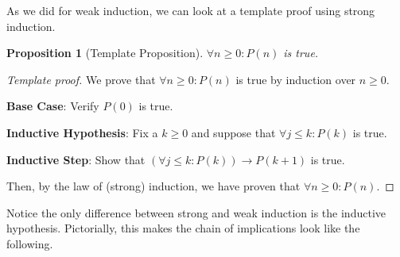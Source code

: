 \documentclass{article}
\newcommand{\ra}{\rightarrow}
\theoremstyle{plain}
\newtheorem*{proposition*}{Proposition}
\theoremstyle{definition}
\begin{document}
As we did for weak induction, we can look at a template proof using strong induction.

\begin{proposition*}[Template Proposition]
    \(\forall n \geq 0 : P(n)\) is true.
\end{proposition*}
\begin{proof}[Template proof]
    We prove that \(\forall n \geq 0 : P(n)\) is true by induction over \(n \geq 0\).
    
    \textbf{Base Case}: Verify \(P(0)\) is true.

    \textbf{Inductive Hypothesis}: Fix a \(k \geq 0\) and suppose that \(\forall j \leq k: P(k)\) is true.

    \textbf{Inductive Step}: Show that \(\left(\forall j \leq k: P(k)\right) \ra P(k+1)\) is true.

    Then, by the law of (strong) induction, we have proven that \(\forall n \geq 0 : P(n)\).
\end{proof}

Notice the only difference between strong and weak induction is the inductive hypothesis. Pictorially, this makes the chain of implications look like the following.
\end{document}
